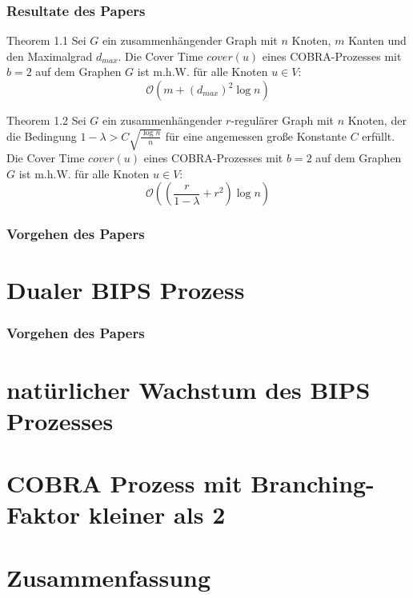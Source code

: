 \documentclass[presentation,xcolor=svgnames,9pt]{beamer}
\begin{document}
	\begin{frame}
		\frametitle{Resultate des Papers}
		\begin{block}{Theorem 1.1}
			Sei $G$ ein zusammenhängender Graph mit
			$n$ Knoten, $m$ Kanten und den
			Maximalgrad $d_{max}$. Die Cover Time
			$cover(u)$ eines COBRA-Prozesses mit $b =
			2$ auf dem Graphen $G$ ist m.h.W. für
			alle Knoten $u \in V$:
			\[\mathcal{O}\left( m + \left( d_{max}
			\right)^2 \log n \right)\]
		\end{block}
		\begin{block}{Theorem 1.2}
			Sei $G$ ein zusammenhängender $r$-regulärer Graph mit
			$n$ Knoten, der die Bedingung
			$1 - \lambda > C
			\sqrt{\frac{\log n}{n}}$ für eine
			angemessen große Konstante $C$ erfüllt. 
			 Die Cover Time
			$cover(u)$ eines COBRA-Prozesses mit $b =
			2$ auf dem Graphen $G$ ist m.h.W. für
			alle Knoten $u \in V$:
			\[\mathcal{O}\left( \left(
				\frac{r}{1-\lambda} + r^2
			\right) \log n \right)\]
		\end{block}
	\end{frame}

	\begin{frame}
		\frametitle{Vorgehen des Papers}
	\end{frame}

	\section{Dualer BIPS Prozess}

	\begin{frame}
		\frametitle{Vorgehen des Papers}
	\end{frame}

	\section{natürlicher Wachstum des BIPS Prozesses}

	\begin{frame}
	\end{frame}

	\section{COBRA Prozess mit Branching-Faktor kleiner als 2}

	\begin{frame}

	\end{frame}

	\section{Zusammenfassung}
\end{document}
